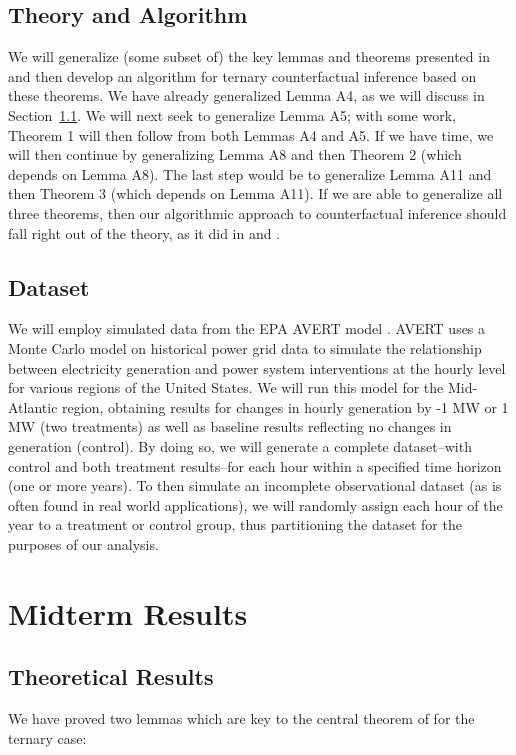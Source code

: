 \documentclass{article}
\begin{document}
\subsection{Theory and Algorithm}

We will generalize (some subset of) the key lemmas and theorems presented in \cite{shalit2017estimating} and then develop an algorithm for ternary counterfactual inference based on these theorems.
We have already generalized Lemma A4, as we will discuss in Section~\ref{subsec:progress-theory}.
We will next seek to generalize Lemma A5; with some work, Theorem 1 will then follow from both Lemmas A4 and A5.
If we have time, we will then continue by generalizing Lemma A8 and then Theorem 2 (which depends on Lemma A8).
The last step would be to generalize Lemma A11 and then Theorem 3 (which depends on Lemma A11).
If we are able to generalize all three theorems, then our algorithmic approach to counterfactual inference should fall right out of the theory, as it did in \cite{johansson2016learning} and \cite{shalit2017estimating}.

\subsection{Dataset}
\label{subsec:dataset}
We will employ simulated data from the EPA AVERT model \cite{epa2017avert}. 
AVERT uses a Monte Carlo model on historical power grid data to simulate the relationship between electricity generation and power system interventions at the hourly level for various regions of the United States.
We will run this model for the Mid-Atlantic region, obtaining results for changes in hourly generation by -1 MW or 1 MW (two treatments) as well as baseline results reflecting no changes in generation (control).
By doing so, we will generate a complete dataset--with control and both treatment results--for each hour within a specified time horizon (one or more years).
To then simulate an incomplete observational dataset (as is often found in real world applications), we will randomly assign each hour of the year to a treatment or control group, thus partitioning the dataset for the purposes of our analysis.

\section{Midterm Results}
\subsection{Theoretical Results}
\label{subsec:progress-theory}
We have proved two lemmas which are key to the central theorem of \cite{shalit2017estimating} for the ternary case:
\end{document}
